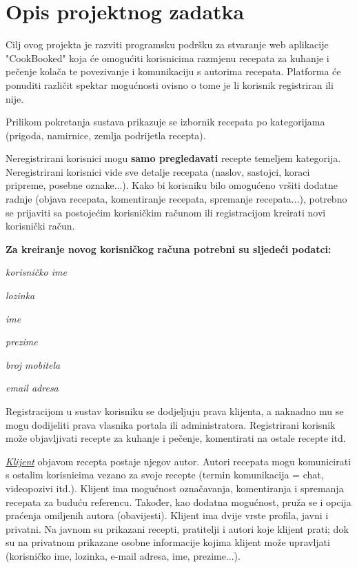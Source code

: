 \chapter{Opis projektnog zadatka}
		
		Cilj ovog projekta je razviti programsku podršku za stvaranje web aplikacije "CookBooked" koja će
		omogućiti korisnicima razmjenu recepata za kuhanje i pečenje kolača te povezivanje i komunikaciju s autorima
		recepata. Platforma će ponuditi različit spektar mogućnosti ovisno o tome je li korisnik registriran ili nije.

		Prilikom pokretanja sustava prikazuje se izbornik recepata po kategorijama (prigoda, namirnice, zemlja podrijetla recepta).		
		
		Neregistrirani korisnici mogu \textbf{samo pregledavati} recepte temeljem kategorija.
		Neregistrirani korisnici vide sve detalje recepata (naslov, sastojci, koraci pripreme, posebne oznake...).
		Kako bi korisniku bilo omogućeno vršiti dodatne radnje (objava recepata, komentiranje recepata, spremanje recepata...),
		potrebno se prijaviti sa postojećim korisničkim računom ili registracijom kreirati novi korisnički račun.

		\textbf{
			Za kreiranje novog korisničkog računa potrebni su sljedeći podatci:
		}
		\begin{packed_item}
			\item \textit{korisničko ime}
			\item \textit{lozinka}
			\item \textit{ime}
			\item \textit{prezime}
			\item \textit{broj mobitela}
			\item \textit{email adresa}
		\end{packed_item}

		Registracijom u sustav korisniku se dodjeljuju prava klijenta, a naknadno mu se mogu dodijeliti prava
		vlasnika portala ili administratora. Registrirani korisnik može objavljivati recepte za kuhanje i pečenje,
		komentirati na ostale recepte itd.
				
		\underline{\textit{Klijent}} objavom recepta postaje njegov autor. Autori recepata mogu komunicirati s ostalim
		korisnicima vezano za svoje recepte (termin komunikacija = chat, videopozivi itd.). Klijent ima mogućnost označavanja, 
		komentiranja i spremanja recepata za buduću referencu. Također, kao dodatna mogućnost, pruža se i opcija praćenja 
		omiljenih autora (obavijesti). Klijent ima dvije vrste profila, javni i privatni. Na javnom su prikazani recepti,
		pratitelji i autori koje klijent prati; dok su na privatnom prikazane osobne informacije kojima klijent može
		upravljati (korisničko ime, lozinka, e-mail adresa, ime, prezime...).
		
